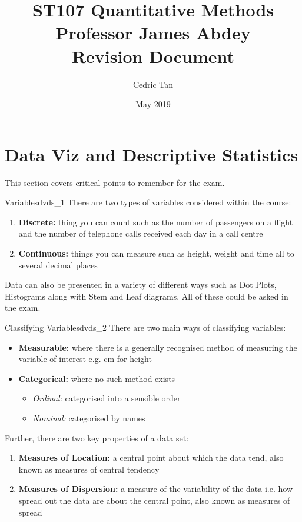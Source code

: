 \documentclass[12pt, letterpaper]{article}
\title{
	{ST107 Quantitative Methods}\\
	{\large{Professor James Abdey}}\\
	{\large{Revision Document}}
}
\author{Cedric Tan}
\date{May 2019}
\begin{document}
\maketitle
{}

\newpage
\tableofcontents
\newpage

\section{Data Viz and Descriptive Statistics}
This section covers critical points to remember for the exam.
\begin{theo}{Variables}{dvds_1}
	There are two types of variables considered within the course:
	\begin{enumerate}
		\item \textbf{Discrete:} thing you can count such as the number of passengers on a flight and the number of telephone calls received each day in a call centre
		\item \textbf{Continuous:} things you can measure such as height, weight and time all to several decimal places
	\end{enumerate}
\end{theo}
Data can also be presented in a variety of different ways such as Dot Plots, Histograms along with Stem and Leaf diagrams. All of these could be asked in the exam.

\begin{theo}{Classifying Variables}{dvds_2}
	There are two main ways of classifying variables:
	\begin{itemize}
		\item \textbf{Measurable:} where there is a generally recognised method of measuring the variable of interest e.g. cm for height
		\item \textbf{Categorical:} where no such method exists
		\begin{itemize}
			\item \textit{Ordinal:} categorised into a sensible order
			\item \textit{Nominal:} categorised by names
		\end{itemize}
	\end{itemize}
	Further, there are two key properties of a data set:
	\begin{enumerate}
		\item \textbf{Measures of Location:} a central point about which the data tend, also known as measures of central tendency
		\item \textbf{Measures of Dispersion:} a measure of the variability of the data i.e. how spread out the data are about the central point, also known as measures of spread
	\end{enumerate}
\end{theo}
\end{document}
